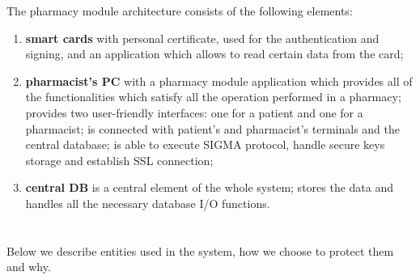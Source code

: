 The pharmacy module architecture consists of the following elements:
\begin{enumerate}
\item \textbf{smart cards} with personal certificate, used for the authentication and signing, and an application which allows to read certain data from the card;
\item \textbf{pharmacist's PC} with a pharmacy module application which provides all of the functionalities which satisfy all the operation performed in a pharmacy; provides two user-friendly interfaces: one for a patient and one for a pharmacist; is connected with patient’s and pharmacist’s terminals and the central database; is able to execute SIGMA protocol, handle secure keys storage and establish SSL connection;
\item{\textbf{central DB}} is a central element of the whole system; stores the data and handles all the necessary database I/O functions.
\end{enumerate}

\section{}

Below we describe entities used in the system, how we choose to protect them and why.

\subsection{}

\subsubsection{}

